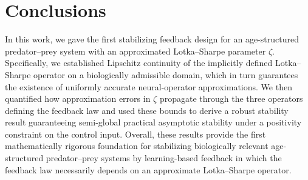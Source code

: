 \documentclass[journal,twoside,web]{ieeecolor}
\begin{document}

\section{Conclusions}
In this work, we gave the first stabilizing feedback design for an age-structured predator–prey system with an approximated Lotka–Sharpe parameter 
$\zeta$. Specifically, we established Lipschitz continuity of the implicitly defined Lotka–Sharpe operator on a biologically admissible domain, which in turn guarantees the existence of uniformly accurate neural-operator approximations. We then quantified how approximation errors in $\zeta$ propagate through the three operators defining the feedback law and used these bounds to derive a robust stability result guaranteeing semi-global practical asymptotic stability under a positivity constraint on the control input. Overall, these results provide the first mathematically rigorous foundation for stabilizing biologically relevant age-structured predator–prey systems by learning-based feedback in which the feedback law necessarily depends on an approximate Lotka–Sharpe operator. 
\end{document}
